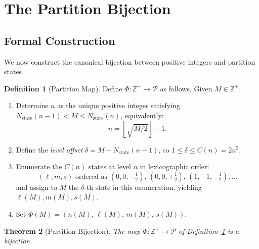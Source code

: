\documentclass[twocolumn,10pt,a4paper]{article}
\theoremstyle{thmstyle}
\newtheorem{theorem}{Theorem}[section]
\theoremstyle{definition}
\newtheorem{definition}[theorem]{Definition}
\theoremstyle{remark}
\newcommand{\Zp}{\mathbb{Z}^{+}}
\newcommand{\Parts}{\mathcal{P}}
\newcommand{\Nstate}{N_{\mathrm{state}}}
\newcommand{\PhiMap}{\varPhi}
\begin{document}
\section{The Partition Bijection}
\label{sec:bijection}

\subsection{Formal Construction}

We now construct the canonical bijection between positive integers and partition states.

\begin{definition}[Partition Map]
\label{def:partition-map}
Define $\PhiMap : \Zp \to \Parts$ as follows. Given $M \in \Zp$:
\begin{enumerate}[leftmargin=1.5em,itemsep=0.2em]
\item Determine $n$ as the unique positive integer satisfying $\Nstate(n-1) < M \leq \Nstate(n)$, equivalently:
\begin{equation}
    n = \left\lfloor \sqrt{M/2} \right\rfloor + 1.
    \label{eq:n-inversion}
\end{equation}

\item Define the \emph{level offset} $\delta = M - \Nstate(n-1)$, so $1 \leq \delta \leq C(n) = 2n^2$.

\item Enumerate the $C(n)$ states at level $n$ in lexicographic order:
\begin{equation}
    (\ell, m, s) \text{ ordered as } (0,0,-\tfrac{1}{2}),\,(0,0,+\tfrac{1}{2}),\,(1,-1,-\tfrac{1}{2}),\ldots
\end{equation}
and assign to $M$ the $\delta$-th state in this enumeration, yielding $\ell(M), m(M), s(M)$.

\item Set $\PhiMap(M) = (n(M),\, \ell(M),\, m(M),\, s(M))$.
\end{enumerate}
\end{definition}

\begin{theorem}[Partition Bijection]
\label{thm:bijection}
The map $\PhiMap : \Zp \to \Parts$ of Definition~\ref{def:partition-map} is a bijection.
\end{theorem}
\end{document}

